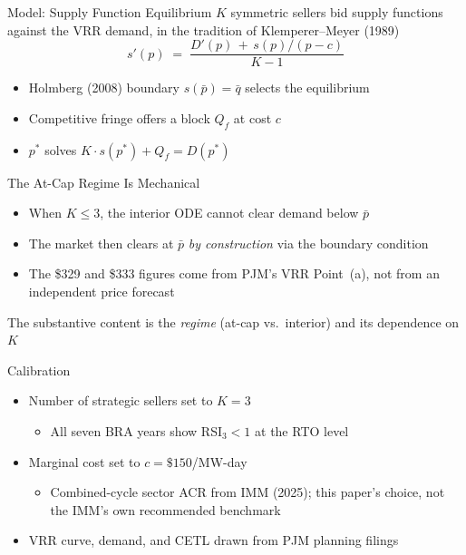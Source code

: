 \documentclass[aspectratio=169,14pt]{beamer}
\begin{document}
\begin{frame}{Model: Supply Function Equilibrium}
  $K$ symmetric sellers bid supply functions against the VRR demand,
  in the tradition of Klemperer--Meyer (1989)
  \vfill
  \begin{equation*}
    s'(p) \;=\; \frac{D'(p) \,+\, s(p)/(p - c)}{K - 1}
  \end{equation*}
  \vfill
  \begin{itemize}
    \item Holmberg (2008) boundary $s(\bar{p}) = \bar{q}$ selects the equilibrium
    \item Competitive fringe offers a block $Q_f$ at cost $c$
    \item $p^*$ solves $K \cdot s(p^*) + Q_f = D(p^*)$
  \end{itemize}
\end{frame}

\begin{frame}{The At-Cap Regime Is Mechanical}
  \begin{itemize}
    \item When $K \leq 3$, the interior ODE cannot clear demand below $\bar{p}$
    \item The market then clears at $\bar{p}$ \emph{by construction}
          via the boundary condition
    \item The \$329 and \$333 figures come from PJM's VRR Point~(a),
          not from an independent price forecast
  \end{itemize}
  \vfill
  \begin{center}
    \alert{The substantive content is the \textit{regime}
    (at-cap vs.\ interior) and its dependence on $K$}
  \end{center}
\end{frame}

\begin{frame}{Calibration}
  \begin{itemize}
    \item Number of strategic sellers set to $K = 3$
      \begin{itemize}
        \item All seven BRA years show RSI$_3 < 1$ at the RTO level
      \end{itemize}
    \item Marginal cost set to $c = \$150$/MW-day
      \begin{itemize}
        \item Combined-cycle sector ACR from IMM (2025); this paper's
              choice, not the IMM's own recommended benchmark
      \end{itemize}
    \item VRR curve, demand, and CETL drawn from PJM planning filings
  \end{itemize}
\end{frame}
\end{document}
